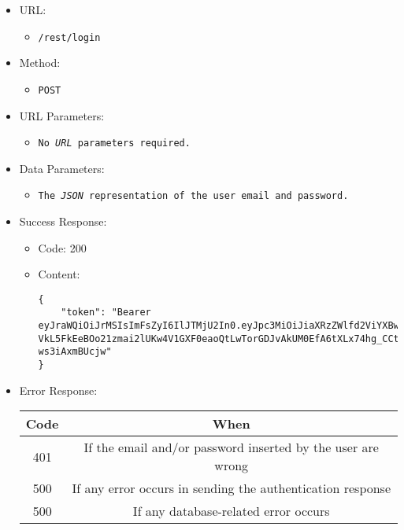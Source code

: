 \begin{itemize}
    
    \item URL: 
    \begin{itemize}
        \item \texttt{/rest/login}
    \end{itemize}
    
    \item Method: 
    \begin{itemize}
        \item \texttt{POST}
    \end{itemize}
    
    \item URL Parameters: 
    \begin{itemize}
        \item \texttt{No \textit{URL} parameters required.} 
    \end{itemize}
    
    \item Data Parameters: 
    \begin{itemize}
        \item \texttt{The \textit{JSON} representation of the user email and password.}
    \end{itemize}
    
    \item Success Response: 
    \begin{itemize}
        \item Code: 200
        \item Content:
        \begin{lstlisting}
{
    "token": "Bearer eyJraWQiOiJrMSIsImFsZyI6IlJTMjU2In0.eyJpc3MiOiJiaXRzZWlfd2ViYXBwIiwiYXVkIjoidXNlciIsImV4cCI6MTY4MjY4NDM1MywianRpIjoiVG1xYmMweWR6UjM3Y3BxNzVWRlFTQSIsImlhdCI6MTY4MjU5Nzk1MywibmJmIjoxNjgyNTk3ODMzLCJlbWFpbCI6Im1jaGF1ZHJldDBAZGFpbHltYWlsLmNvLnVrIiwib3duZXJfaWQiOjF9.FrVxA0wcw5nBcWmUl67RPA3lxMxcfij3Ri0ny8SJEIlNQNEdymF_fuTD2NQSWph3LwDvUnwe7gIfYkd69nZGmFuan-VkL5FkEeBOo21zmai2lUKw4V1GXF0eaoQtLwTorGDJvAkUM0EfA6tXLx74hg_CCtxpd6llu6SaaYM5vQNupIJ25PLDRPjmghLdiA5Q8aIIyr_2HrXEgq4b3WPsRaU8uZsNIEP2JoPeU5CYdsmkS_ADWBaIxnJ3k83pbTu83mh8eYCVTODhQLhrtUzZY15PlwzhWQBh8gU2AcyFIPdhEtQdlINN3n6o7twb6Zz_bntjGjUgy-ws3iAxmBUcjw"
}
        \end{lstlisting}    
    \end{itemize}
    
    \item Error Response:
    \begin{table}[!h]
    \centering 
    \begin{tabular}{|c|c|}
    \hline
    \multicolumn{1}{|c|}{\textbf{Code}} & \multicolumn{1}{c|}{\textbf{When}} \\ \hline
    401 & If the email and/or password inserted by the user are wrong \\\hline
    500 & If any error occurs in sending the authentication response \\\hline
    500 & If any database-related error occurs \\\hline
    \end{tabular} 
    \end{table} 
    

\end{itemize}
